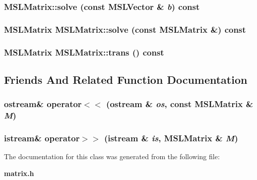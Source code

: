 \subsubsection{ MSLMatrix::solve (const {\bf MSLVector} \& {\em b}) const\hspace{0.3cm}{\tt  [inline]}}\label{class_MSLMatrix_a14}


\subsubsection{\setlength{\rightskip}{0pt plus 5cm}MSLMatrix MSLMatrix::solve (const MSLMatrix \&) const}\label{class_MSLMatrix_a13}


\subsubsection{\setlength{\rightskip}{0pt plus 5cm}MSLMatrix MSLMatrix::trans () const}\label{class_MSLMatrix_a10}




\subsection{Friends And Related Function Documentation}
\subsubsection{\setlength{\rightskip}{0pt plus 5cm}ostream\& operator$<$$<$ (ostream \& {\em os}, const MSLMatrix \& {\em M})\hspace{0.3cm}{\tt  [friend]}}\label{class_MSLMatrix_l0}


\subsubsection{\setlength{\rightskip}{0pt plus 5cm}istream\& operator$>$$>$ (istream \& {\em is}, MSLMatrix \& {\em M})\hspace{0.3cm}{\tt  [friend]}}\label{class_MSLMatrix_l1}




The documentation for this class was generated from the following file:\begin{CompactItemize}
\item 
{\bf matrix.h}\end{CompactItemize}
